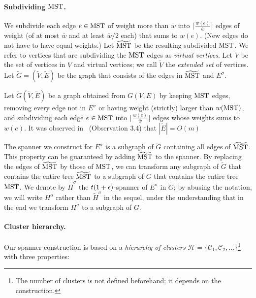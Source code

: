 \paragraph{Subdividing $\mathrm{MST}$.~} We subdivide each edge $e \in \mathrm{MST}$ of weight more than $\bar{w}$ into $\lceil \frac{w(e)}{\bar{w}} \rceil$ edges of weight (of at most $\bar{w}$ and at least $\bar{w}/2$ each) that sums to $w(e)$. (New edges do not have to have equal weights.)  Let $\widetilde{\mathrm{MST}}$ be the resulting subdivided $\mathrm{MST}$.
We refer to vertices that are subdividing the $\mathrm{MST}$  edges as \emph{virtual vertices}. Let $\tilde V$ be the set of vertices in $V$ and virtual vertices; we call $\tilde{V}$  the {\em extended set} of vertices. Let $\tilde G = (\tilde V,\tilde E)$ be the graph that consists of the edges in $\widetilde{\mathrm{MST}}$ and $E^{\sigma}$. 


Let $\tilde{G}(\tilde{V}, \tilde{E})$ be a graph obtained from $G(V,E)$ by keeping $\operatorname{\mathrm{MST}}$ edges, removing every edge not in $E^{\sigma}$ or having weight (strictly) larger than $w(\operatorname{\mathrm{MST}})$, and subdividing each edge $e \in \mathrm{MST}$ into $\lceil \frac{w(e)}{\bar{w}} \rceil$ edges whose weights sums to $w(e)$. It was observed in~\cite{LS21} (Observation 3.4) that $|\tilde{E}| = O(m)$  


The spanner we construct for $E^{\sigma}$ is a subgraph of $\tilde{G}$ containing all edges of $\widetilde{\mathrm{MST}}$. This property can be guaranteed by adding $\widetilde{\mathrm{MST}}$ to the spanner. By replacing the edges of $\widetilde{\mathrm{MST}}$ by those of $\mathrm{MST}$, we can transform any subgraph of $\tilde{G}$ that contains the entire tree $\widetilde{\mathrm{MST}}$ to a subgraph of $G$ that contains the entire tree $\mathrm{MST}$. We denote  by $\tilde H^{\sigma}$ the $t(1+\epsilon)$-spanner of $E^{\sigma}$ in $\tilde{G}$; by abusing the notation, we will write $H^{\sigma}$ rather than $\tilde H^{\sigma}$ in the sequel, under the understanding that in the end we transform $H^{\sigma}$ to a subgraph of $G$. 


\paragraph{Cluster hierarchy.~} Our spanner construction is based on a \emph{hierarchy of clusters} $\mathcal{H} = \{\mathcal{C}_1,\mathcal{C}_2, \ldots \}$\footnote{The number of clusters is not defined beforehand; it depends on the construction.} with three properties: 

